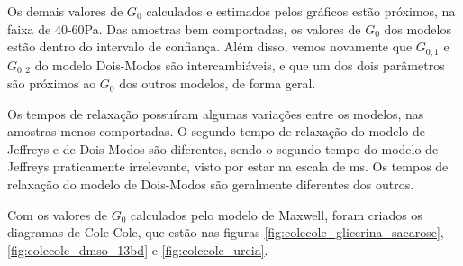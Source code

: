 		Os demais valores de \(G_0\) calculados e estimados pelos gráficos estão próximos, na faixa de 40-60Pa. Das amostras bem comportadas, os valores de \(G_0\) dos modelos estão dentro do intervalo de confiança. Além disso, vemos novamente que \(G_{0,1}\) e \(G_{0,2}\) do modelo Dois-Modos são intercambiáveis, e que um dos dois parâmetros são próximos ao \(G_0\) dos outros modelos, de forma geral.
		
		Os tempos de relaxação possuíram algumas variações entre os modelos, nas amostras menos comportadas. O segundo tempo de relaxação do modelo de Jeffreys e de Dois-Modos são diferentes, sendo o segundo tempo do modelo de Jeffreys praticamente irrelevante, visto por estar na escala de ms. Os tempos de relaxação do modelo de Dois-Modos são geralmente diferentes dos outros.
		
		Com os valores de \(G_0\) calculados pelo modelo de Maxwell, foram criados os diagramas de Cole-Cole, que estão nas figuras \ref{fig:colecole_glicerina_sacarose}, \ref{fig:colecole_dmso_13bd} e \ref{fig:colecole_ureia}.
		

